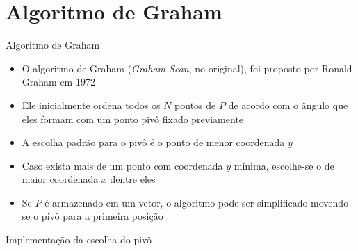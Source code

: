 \section{Algoritmo de Graham}

\begin{frame}[fragile]{Algoritmo de Graham}

    \begin{itemize}
        \item O algoritmo de Graham (\textit{Graham Scan}, no original), foi proposto por
            Ronald Graham em 1972

        \item Ele inicialmente ordena todos os $N$ pontos de $P$ de acordo com o ângulo que eles 
            formam com um ponto pivô fixado previamente

        \item A escolha padrão para o pivô é o ponto de menor coordenada $y$ 

        \item Caso exista mais de um ponto com coordenada $y$ mínima, escolhe-se o de maior 
            coordenada $x$ dentre eles

        \item Se $P$ é armazenado em um vetor, o algoritmo pode ser simplificado movendo-se o pivô 
            para a primeira posição
    \end{itemize}

\end{frame}

\begin{frame}[fragile]{Implementação da escolha do pivô}
\end{frame}

